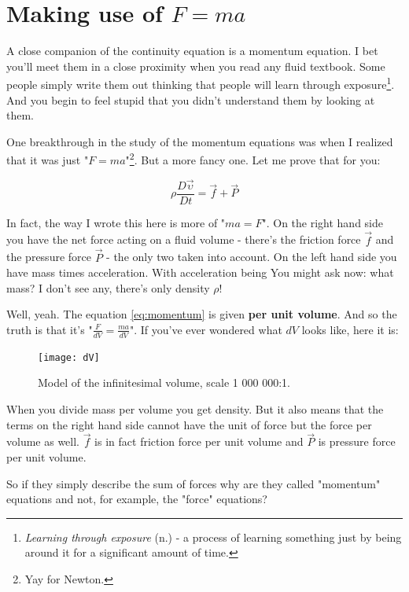 \documentclass[12pt]{report}
\begin{document}
\section{Making use of $F = ma$} \label{chap:momentum}

A close companion of the continuity equation is a momentum equation. I bet you'll meet them in a close proximity when you read any fluid textbook. Some people simply write them out thinking that people will learn through exposure\footnote{\textit{Learning through exposure} (n.) - a process of learning something just by being around it for a significant amount of time.}. And you begin to feel stupid that you didn't understand them by looking at them.

One breakthrough in the study of the momentum equations was when I realized that it was just "$F=ma$"\footnote{Yay for Newton.}. But a more fancy one. Let me prove that for you:

\begin{equation}
\rho \frac{D \vec{\upsilon}}{Dt} = \vec{f} + \vec{P}
\label{eq:momentum}
\end{equation}


In fact, the way I wrote this here is more of "$ma=F$". On the right hand side you have the net force acting on a fluid volume - there's the friction force $\vec{f}$ and the pressure force $\vec{P}$ - the only two taken into account. On the left hand side you have mass times acceleration. With acceleration being You might ask now: what mass? I don't see any, there's only density $\rho$! 

Well, yeah. The equation \ref{eq:momentum} is given \textbf{per unit volume}. And so the truth is that it's "$\frac{F}{dV} = \frac{ma}{dV}$". If you've ever wondered what $dV$ looks like, here it is:

\begin{figure}[H]
\centering\texttt{[image: dV]}
\caption{Model of the infinitesimal volume, scale 1 000 000:1.}			
\label{fig:infinitesimals}
\end{figure}


When you divide mass per volume you get density. But it also means that the terms on the right hand side cannot have the unit of force but the force per volume as well. $\vec{f}$ is in fact friction force per unit volume and $\vec{P}$ is pressure force per unit volume.



So if they simply describe the sum of forces why are they called "momentum" equations and not, for example, the "force" equations?




\newpage

\begin{thebibliography}{50}



\end{thebibliography}
\end{document}
